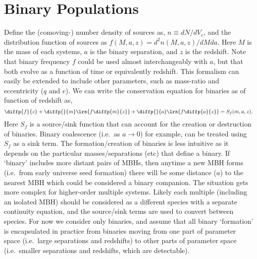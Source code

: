 \documentclass[10pt, oneside, onecolumn]{article}   	%
\begin{document}
    \section{Binary Populations}

        Define the (comoving-) number density of sources as, $n \equiv dN / dV_c$, and the distribution function of sources as $f(M,a,z) = d^2 n(M,a,z) / dM da$.  Here $M$ is the mass of each systems, $a$ is the binary separation, and $z$ is the redshift.  Note that binary frequency $f$ could be used almost interchangeably with $a$, but that both evolve as a function of time or equivalently redshift.  This formalism can easily be extended to include other parameters, such as mass-ratio and eccentricity ($q$ and $e$).  We can write the conservation equation for binaries as of function of redshift as,
        \begin{equation}
        \label{eq:conservation}
        \diffp{f}{z} + \diffp{}{m} \lrs{f \diffp{m}{z}} + \diffp{}{a} \lrs{f \diffp{a}{z}} = S_f(m, a, z).
        \end{equation}
        Here $S_f$ is a source/sink function that can account for the creation or destruction of binaries.  Binary coalescence (i.e.~as $a\rightarrow 0$) for example, can be treated using $S_f$ as a sink term.  The formation/creation of binaries is less intuitive as it depends on the particular masses/separations (etc) that define a binary.  If `binary' includes more distant pairs of MBHs, then anytime a new MBH forms (i.e.~from early universe seed formation) there will be some distance ($a$) to the nearest MBH which could be considered a binary companion.  The situation gets more complex for higher-order multiple systems.  Likely each multiple (including an isolated MBH) should be considered as a different species with a separate continuity equation, and the source/sink terms are used to convert between species.  For now we consider only binaries, and assume that all binary `formation' is encapsulated in practice from binaries moving from one part of parameter space (i.e.~large separations and redshifts) to other parts of parameter space (i.e.~smaller separations and redshifts, which are detectable).
\end{document}
